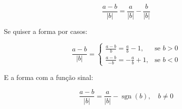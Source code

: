 
                                                                                
 \[                                                                             
 \frac{a-b}{|b|} = \frac{a}{|b|} - \frac{b}{|b|}                                
 \]                                                                             
                                                                                

Se quiser a forma por casos:                                                    

                                                                                
 \[                                                                             
 \frac{a-b}{|b|} =                                                              
 \begin{cases}                                                                  
 \frac{a-b}{b} = \frac{a}{b} - 1, & \text{se } b > 0 \\                         
 \frac{a-b}{-b} = -\frac{a}{b} + 1, & \text{se } b < 0                          
 \end{cases}                                                                    
 \]                                                                             
                                                                                

E a forma com a função sinal:                                                   

                                                                                
 \[                                                                             
 \frac{a-b}{|b|} = \frac{a}{|b|} - \operatorname{sgn}(b), \quad b \neq 0        
 \]                                                                             
                                                                   
